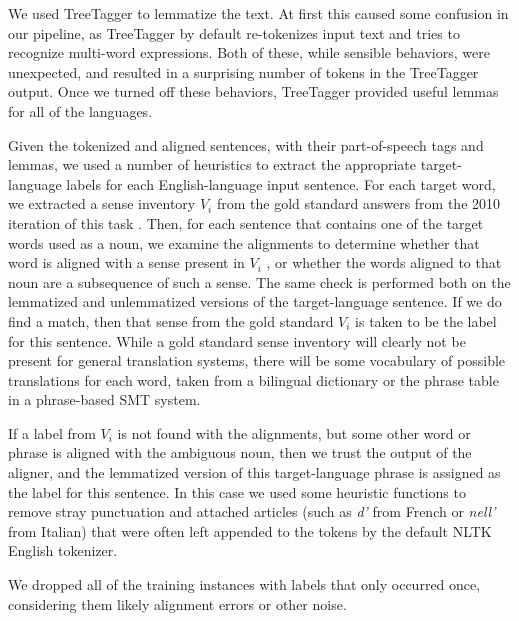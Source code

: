 \documentclass[11pt,letterpaper]{article}
\begin{document}
We used TreeTagger \cite{Schmid95improvementsin} to lemmatize the text. At
first this caused some confusion in our pipeline, as TreeTagger by default
re-tokenizes input text and tries to recognize multi-word expressions. Both of
these, while sensible behaviors, were unexpected, and resulted in a surprising 
number of tokens in the TreeTagger output. Once we turned off these behaviors,
TreeTagger provided useful lemmas for all of the languages.

Given the tokenized and aligned sentences, with their part-of-speech tags and
lemmas, we used a number of heuristics to extract the appropriate
target-language labels for each English-language input sentence.  For each
target word, we extracted a sense inventory $V_i$ from the gold standard
answers from the 2010 iteration of this task \cite{lefever-hoste:2009:SEW}.
Then, for each sentence that contains one of the target words used as a noun,
we examine the alignments to determine whether that word is aligned with a
sense present in $V_i$ , or whether the words aligned to that noun are a
subsequence of such a sense. The same check is performed both on the lemmatized
and unlemmatized versions of the target-language sentence. If we do find a
match, then that sense from the gold standard $V_i$ is taken to be the label
for this sentence. While a gold standard sense inventory will clearly not be
present for general translation systems, there will be some vocabulary of
possible translations for each word, taken from a bilingual dictionary or the
phrase table in a phrase-based SMT system.

If a label from $V_i$ is not found with the alignments, but some other word or
phrase is aligned with the ambiguous noun, then we trust the output of the
aligner, and the lemmatized version of this target-language phrase is assigned
as the label for this sentence. In this case we used some heuristic functions
to remove stray punctuation and attached articles (such as \emph{d'} from
French or \emph{nell'} from Italian) that were often left appended to the
tokens by the default NLTK English tokenizer.

We dropped all of the training instances with labels that only occurred once,
considering them likely alignment errors or other noise.
\end{document}
